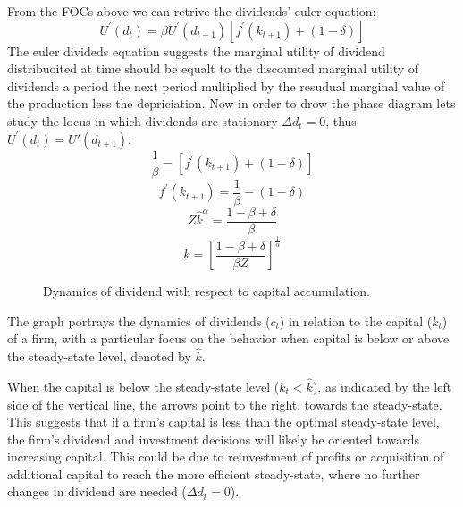 \documentclass[12pt]{article}
\begin{document}
From the FOCs above we can retrive the dividends' euler equation:
\[U^{\prime}\left(d_{t}\right)=\beta U^{\prime}\left(d_{t+1}\right)\left[f^{\prime}\left(k_{t+1}\right)+(1-\delta)\right]\]
The euler divideds equation suggests the marginal utility of dividend distribuoited at time should be equalt to the
discounted marginal utility of dividends a period the next period multiplied by the resudual marginal value of the
production less the depriciation.
Now in order to drow the phase diagram lets study the locus in which dividends are stationary \(\Delta d_t =0\), thus
\(U^{\prime}(d_t) = U'(d_{t+1})\):
\[\frac{1}{\beta}=
\left[f^{\prime}\left(k_{t+1}\right)+(1-\delta)\right]\]
\[
f^{\prime}\left(k_{t+1}\right)= \frac{1}{\beta} - (1-\delta)\]
\[Z\widehat{k}^{\alpha} = \frac{1 - \beta + \delta}{\beta}\]
\[\widehat{k} = {\left[\frac{1 - \beta + \delta}{\beta Z}\right]}^{\frac{1}{\alpha}}\]
\begin{figure}
    \centering
    \caption{Dynamics of dividend with respect to capital accumulation.}
    \label{fig:dividend_dynamics}
\end{figure}

The graph portrays the dynamics of dividends (\(c_t\)) in relation to the capital (\(k_t\)) of a firm, with a
particular focus on the behavior when capital is below or above the steady-state level,  denoted by \(\hat{k}\).

When the capital is below the steady-state level (\(k_t < \hat{k}\)), as indicated by the left side of the vertical
line, the arrows point to the right, towards the steady-state. This suggests that if a firm's capital is less than the
optimal steady-state level, the firm's dividend and investment decisions will likely be oriented towards increasing
capital. This could be  due to reinvestment of profits or acquisition of additional capital to reach the more efficient
steady-state, where no further changes in dividend are needed (\(\Delta d_t = 0\)).
\end{document}
